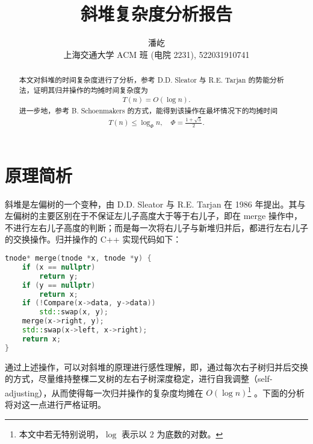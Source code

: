 \documentclass[a4paper]{ctexart}
\title{斜堆复杂度分析报告}
\author{潘屹 \\ {\small 上海交通大学 ACM 班 (电院 2231), 522031910741}}
\date{}
\begin{document}
\maketitle

\begin{abstract}
    本文对斜堆的时间复杂度进行了分析，参考 D.D. Sleator 与 R.E. Tarjan 的势能分析法\cite{sleator1986self}，证明其归并操作的均摊时间复杂度为 \begin{align*}
        T(n) = O(\log n).
    \end{align*}
    进一步地，参考 B. Schoenmakers 的方式\cite{kaldewaij1991derivation}\cite{schoenmakers1997tight}，能得到该操作在最坏情况下的均摊时间 \begin{align*}
        T(n) \le \log_\varPhi n,\quad\varPhi=\frac{1+\sqrt{5}}{2}.
    \end{align*}
\end{abstract}

\section{原理简析}

斜堆是左偏树的一个变种，由 D.D. Sleator 与 R.E. Tarjan 在 1986 年提出。其与左偏树的主要区别在于不保证左儿子高度大于等于右儿子，即在 merge 操作中，不进行左右儿子高度的判断；而是每一次将右儿子与新堆归并后，都进行左右儿子的交换操作。归并操作的 C++ 实现代码如下：

\begin{lstlisting}[language=C++]
tnode* merge(tnode *x, tnode *y) {
    if (x == nullptr)
        return y;
    if (y == nullptr)
        return x;
    if (!Compare(x->data, y->data))
        std::swap(x, y);
    merge(x->right, y);
    std::swap(x->left, x->right);
    return x;
}
\end{lstlisting}

通过上述操作，可以对斜堆的原理进行感性理解，即，通过每次右子树归并后交换的方式，尽量维持整棵二叉树的左右子树深度稳定，进行自我调整（self-adjusting），从而使得每一次归并操作的复杂度均摊在 $O(\log n)$\footnote{本文中若无特别说明，$\log$ 表示以 $2$ 为底数的对数。} 。下面的分析将对这一点进行严格证明。
\end{document}
